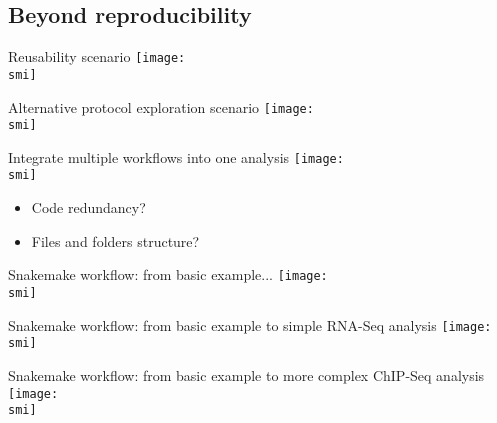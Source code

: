\documentclass[10pt]{beamer}
\def\smi{out/ln/updir/mw-gcthesis-oral/library.bib}
\begin{document}
\subsection{Beyond reproducibility}
\begin{frame}{Reusability scenario}
  \def\smi{out/ln/updir/mw-gcthesis-oral/ink/reproducibility/arrow_reproducibility_exchange_data.pdf}
  \texttt{[image: \\smi]}
\end{frame}
\begin{frame}{Alternative protocol exploration scenario}
  \def\smi{out/ln/updir/mw-gcthesis-oral/ink/reproducibility/arrow_reproducibility_alternative_protocol.pdf}
  \texttt{[image: \\smi]}
\end{frame}
\begin{frame}{Integrate multiple workflows into one analysis}
  \def\smi{out/ln/updir/mw-gcthesis-oral/ink/reproducibility/arrow_reproducibility_integration.pdf}
  \texttt{[image: \\smi]}
  \begin{multicols}{2}
    \begin{itemize}
      \item Code redundancy? %
      \item Files and folders structure?
    \end{itemize}
  \end{multicols}
\end{frame}
\begin{frame}{Snakemake workflow: from basic example...}
  \def\smi{out/ln/updir/mw-gcthesis-oral/ink/snakemake/simple_workflow.pdf}
  \texttt{[image: \\smi]}
\end{frame}
\begin{frame}{Snakemake workflow: from basic example to simple RNA-Seq analysis}
  \def\smi{out/ln/updir/mw-gcthesis-oral/ink/snakemake/rna-seq-star-deseq2.png}
  \texttt{[image: \\smi]}
\end{frame}
\begin{frame}{Snakemake workflow: from basic example to more complex ChIP-Seq analysis}
  \def\smi{out/ln/updir/mw-gcthesis-oral/ink/snakemake/snakechunk.png}
  \texttt{[image: \\smi]}
\end{frame}
\end{document}
